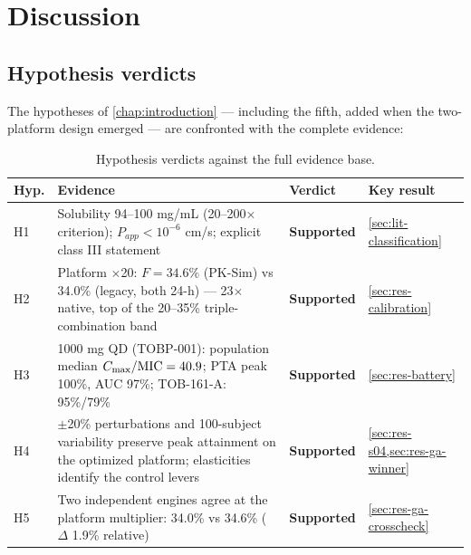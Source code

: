 \chapter{Discussion}
\label{chap:discussion}

\section{Hypothesis verdicts}
\label{sec:hypothesis-verdicts}
The hypotheses of \cref{chap:introduction} --- including the fifth, added when the two-platform design emerged --- are confronted with the complete evidence:

\begin{table}[htbp]
\centering
\caption{Hypothesis verdicts against the full evidence base.}
\label{tab:verdicts}
\small
\begin{tabular}{p{1.4cm}p{6.4cm}p{2.2cm}p{4.0cm}}
\toprule
Hyp. & Evidence & Verdict & Key result \\
\midrule
H1 & Solubility 94--100 mg/mL (20--200$\times$ criterion); $P_{app} < 10^{-6}$ cm/s; explicit class III statement \citep{Asad2023} & \textbf{Supported} & \cref{sec:lit-classification} \\
H2 & Platform $\times$20: $F = 34.6\%$ (PK-Sim) vs 34.0\% (legacy, both 24-h) --- 23$\times$ native, top of the 20--35\% triple-combination band & \textbf{Supported} & \cref{sec:res-calibration} \\
H3 & 1000 mg QD (TOBP-001): population median $C_{\max}/\mathrm{MIC} = 40.9$; PTA peak 100\%, AUC 97\%; TOB-161-A: 95\%/79\% & \textbf{Supported} & \cref{sec:res-battery} \\
H4 & $\pm$20\% perturbations and 100-subject variability preserve peak attainment on the optimized platform; elasticities identify the control levers & \textbf{Supported} & \cref{sec:res-s04,sec:res-ga-winner} \\
H5 & Two independent engines agree at the platform multiplier: 34.0\% vs 34.6\% ($\Delta$ 1.9\% relative) & \textbf{Supported} & \cref{sec:res-ga-crosscheck} \\
\bottomrule
\end{tabular}
\end{table}

